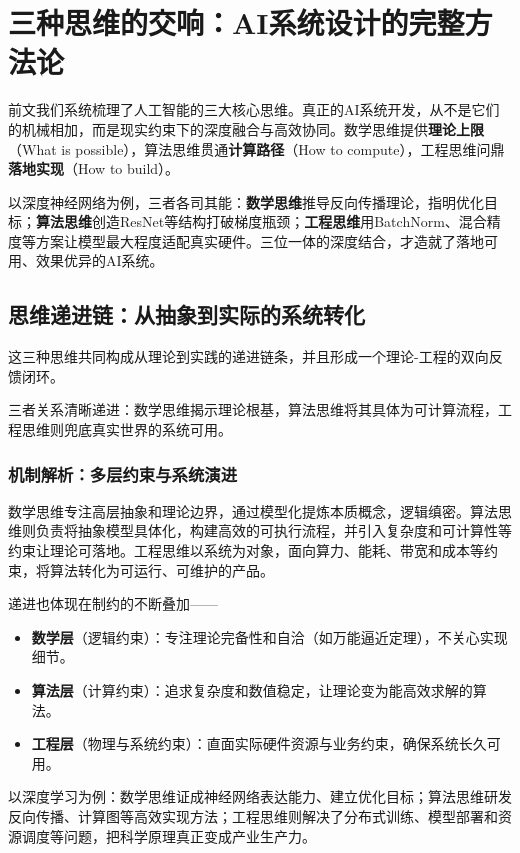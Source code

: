 \section{三种思维的交响：AI系统设计的完整方法论}

前文我们系统梳理了人工智能的三大核心思维。真正的AI系统开发，从不是它们的机械相加，而是现实约束下的深度融合与高效协同。数学思维提供\textbf{理论上限}（What is possible），算法思维贯通\textbf{计算路径}（How to compute），工程思维问鼎\textbf{落地实现}（How to build）。

以深度神经网络为例，三者各司其能：\textbf{数学思维}推导反向传播理论，指明优化目标；\textbf{算法思维}创造ResNet等结构打破梯度瓶颈；\textbf{工程思维}用BatchNorm、混合精度等方案让模型最大程度适配真实硬件。三位一体的深度结合，才造就了落地可用、效果优异的AI系统。

\subsection{思维递进链：从抽象到实际的系统转化}
这三种思维共同构成从理论到实践的递进链条，并且形成一个理论-工程的双向反馈闭环。

三者关系清晰递进：数学思维揭示理论根基，算法思维将其具体为可计算流程，工程思维则兜底真实世界的系统可用。

\subsubsection{机制解析：多层约束与系统演进}

数学思维专注高层抽象和理论边界，通过模型化提炼本质概念，逻辑缜密。算法思维则负责将抽象模型具体化，构建高效的可执行流程，并引入复杂度和可计算性等约束让理论可落地。工程思维以系统为对象，面向算力、能耗、带宽和成本等约束，将算法转化为可运行、可维护的产品。

递进也体现在制约的不断叠加——
\begin{itemize}
    \item \textbf{数学层}（逻辑约束）：专注理论完备性和自洽（如万能逼近定理），不关心实现细节。
    \item \textbf{算法层}（计算约束）：追求复杂度和数值稳定，让理论变为能高效求解的算法。
    \item \textbf{工程层}（物理与系统约束）：直面实际硬件资源与业务约束，确保系统长久可用。
\end{itemize}

以深度学习为例：数学思维证成神经网络表达能力、建立优化目标；算法思维研发反向传播、计算图等高效实现方法；工程思维则解决了分布式训练、模型部署和资源调度等问题，把科学原理真正变成产业生产力。

